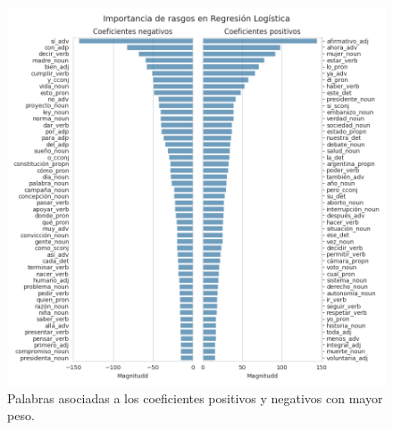 \begin{figure}[h!]
    \centering
    \includegraphics[scale=0.5]{./images/graphs/lr_feature_importance_barplot_log_proba.png}
    \caption{Palabras asociadas a los coeficientes positivos y negativos con mayor peso.}
    \label{fig-results-models-feature-importance}
\end{figure}